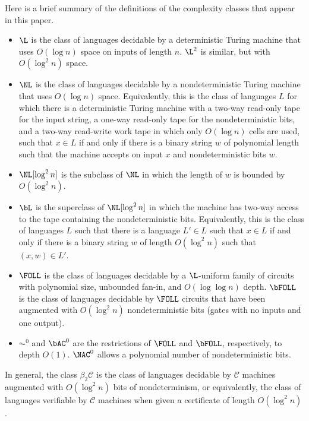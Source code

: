 \documentclass{article}
\begin{document}
Here is a brief summary of the definitions of the complexity classes that appear in this paper.

\begin{itemize}
\item
  $\L$ is the class of languages decidable by a deterministic Turing machine that uses $O(\log n)$ space on inputs of length $n$.
  $\L^2$ is similar, but with $O(\log^2 n)$ space.
\item
  $\NL$ is the class of languages decidable by a nondeterministic Turing machine that uses $O(\log n)$ space.
  Equivalently, this is the class of languages $L$ for which there is a deterministic Turing machine with a two-way read-only tape for the input string, a one-way read-only tape for the nondeterministic bits, and a two-way read-write work tape in which only $O(\log n)$ cells are used, such that $x \in L$ if and only if there is a binary string $w$ of polynomial length such that the machine accepts on input $x$ and nondeterministic bits $w$.
\item $\NL[\log^2 n]$ is the subclass of $\NL$ in which the length of $w$ is bounded by $O(\log^2 n)$.
\item $\bL$ is the superclass of $\NL[\log^2 n]$ in which the machine has two-way access to the tape containing the nondeterministic bits.
  Equivalently, this is the class of languages $L$ such that there is a language $L' \in L$ such that $x \in L$ if and only if there is a binary string $w$ of length $O(\log^2 n)$ such that $(x, w) \in L'$.
\item
  $\FOLL$ is the class of languages decidable by a $\L$-uniform family of circuits with polynomial size, unbounded fan-in, and $O(\log \log n)$ depth.
  $\bFOLL$ is the class of languages decidable by $\FOLL$ circuits that have been augmented with $O(\log^2 n)$ nondeterministic bits (gates with no inputs and one output).
\item
  $\AC^0$ and $\bAC^0$ are the restrictions of $\FOLL$ and $\bFOLL$, respectively, to depth $O(1)$.
  $\NAC^0$ allows a polynomial number of nondeterministic bits.
\end{itemize}
In general, the class $\beta_2 \mathcal{C}$ is the class of languages decidable by $\mathcal{C}$ machines augmented with $O(\log^2 n)$ bits of nondeterminism, or equivalently, the class of languages verifiable by $\mathcal{C}$ machines when given a certificate of length $O(\log^2 n)$.
\end{document}
